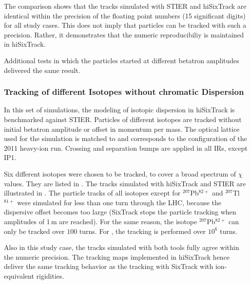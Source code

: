 The comparison shows that the tracks simulated with STIER and hiSixTrack are identical within the precision of the floating point numbers (15 significant digits) for all study cases.  This does not imply that particles can be tracked with such a precision. Rather, it demonstrates that the numeric reproducibiliy is maintained in hiSixTrack.

Additional tests in which the particles started at different betatron amplitudes delivered the same result.


\newpage

\subsubsection{Tracking of different Isotopes without chromatic Dispersion}




In this set of simulations, the modeling of isotopic dispersion in hiSixTrack is benchmarked against STIER. Particles of different isotopes are tracked without initial betatron amplitude or offset in momentum per mass. The optical lattice used for the simulation is matched to \lead and corresponds to the configuration of the 2011 heavy-ion run. Crossing and separation bumps are applied in all IRs, except IP1. 

Six different isotopes were chosen to be tracked, to cover a broad spectrum of $\chi$ values. They are listed in . The tracks simulated with hiSixTrack and STIER are illustrated in . The particle tracks of all isotopes except for $^{207}$Pb$^{82+}$ and $^{207}$Tl$^{81+}$ were simulated for less than one turn through the LHC, because the dispersive offset becomes too large (SixTrack stops the particle tracking when amplitudes of 1\,m are reached). For the same reason, the isotope $^{207}$Pb$^{82+}$ can only be tracked over $100$ turns. For , the tracking is performed over $10^6$ turns.

Also in this study case, the tracks simulated with both tools fully agree within the numeric precision. The tracking maps implemented in hiSixTrack hence deliver the same tracking behavior as the tracking with SixTrack with ion-equivalent rigidities. 



